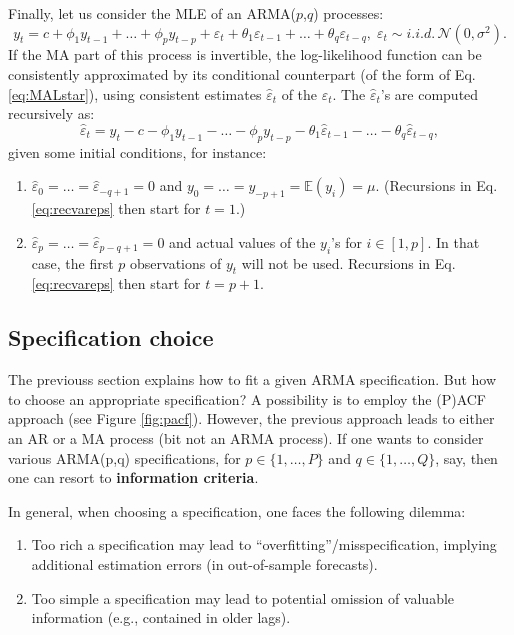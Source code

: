 \documentclass[
  12pt,
]{book}
\providecommand{\tightlist}{%
  \setlength{\itemsep}{0pt}\setlength{\parskip}{0pt}}
\theoremstyle{definition}
\theoremstyle{definition}
\theoremstyle{definition}
\theoremstyle{definition}
\theoremstyle{remark}
\begin{document}
Finally, let us consider the MLE of an ARMA(\(p\),\(q\)) processes:
\[
y_t = c + \phi_1 y_{t-1} + \dots + \phi_p y_{t-p} + \varepsilon_t + \theta_1 \varepsilon_{t-1} +
\dots + \theta_q \varepsilon_{t-q} , \; \varepsilon_t \sim i.i.d.\,\mathcal{N}(0,\sigma^2).
\]
If the MA part of this process is invertible, the log-likelihood function can be consistently approximated by its conditional counterpart (of the form of Eq. \eqref{eq:MALstar}), using consistent estimates \(\hat\varepsilon_t\) of the \(\varepsilon_t\). The \(\hat\varepsilon_t\)'s are computed recursively as:
\begin{equation}
\hat\varepsilon_t = y_t - c - \phi_1 y_{t-1} - \dots - \phi_p y_{t-p} - \theta_1 \hat\varepsilon_{t-1} - \dots - \theta_q \hat\varepsilon_{t-q},\label{eq:recvareps}
\end{equation}
given some initial conditions, for instance:

\begin{enumerate}
\def\labelenumi{\alph{enumi}.}
\tightlist
\item
  \(\hat\varepsilon_0=\dots=\hat\varepsilon_{-q+1}=0\) and \(y_{0}=\dots=y_{-p+1}=\mathbb{E}(y_i)=\mu\). (Recursions in Eq. \eqref{eq:recvareps} then start for \(t=1\).)
\item
  \(\hat\varepsilon_p=\dots=\hat\varepsilon_{p-q+1}=0\) and actual values of the \(y_{i}\)'s for \(i \in [1,p]\). In that case, the first \(p\) observations of \(y_t\) will not be used. Recursions in Eq. \eqref{eq:recvareps} then start for \(t=p+1\).
\end{enumerate}

\hypertarget{specification-choice}{%
\subsection{Specification choice}\label{specification-choice}}

The previouss section explains how to fit a given ARMA specification. But how to choose an appropriate specification? A possibility is to employ the (P)ACF approach (see Figure \ref{fig:pacf}). However, the previous approach leads to either an AR or a MA process (bit not an ARMA process). If one wants to consider various ARMA(p,q) specifications, for \(p \in \{1,\dots,P\}\) and \(q \in \{1,\dots,Q\}\), say, then one can resort to \textbf{information criteria}.

In general, when choosing a specification, one faces the following dilemma:

\begin{enumerate}
\def\labelenumi{\alph{enumi}.}
\tightlist
\item
  Too rich a specification may lead to ``overfitting''/misspecification, implying additional estimation errors (in out-of-sample forecasts).
\item
  Too simple a specification may lead to potential omission of valuable information (e.g., contained in older lags).
\end{enumerate}
\end{document}
